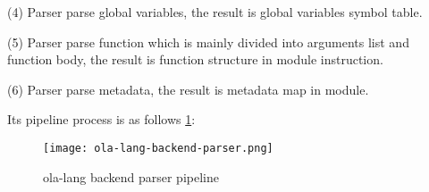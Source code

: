\begin{itemize}
(4) Parser parse global variables, the result is global variables symbol table.

(5) Parser parse function which is mainly divided into arguments list and function body, the result is function structure in module instruction.

(6) Parser parse metadata, the result is metadata map in module.

Its pipeline process is as follows \ref{fig:ola-lang-backend-parser}:
\begin{figure}[!htbp]
    \centering
    \texttt{[image: ola-lang-backend-parser.png]}
    \caption{ola-lang backend parser pipeline}
    \label{fig:ola-lang-backend-parser}
\end{figure}
\end{itemize}
